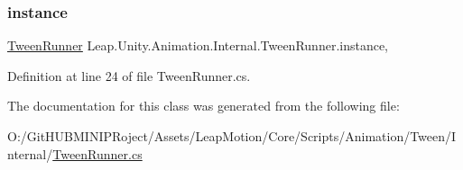 \subsubsection{\texorpdfstring{instance}{instance}}
{\footnotesize\ttfamily \mbox{\hyperlink{class_leap_1_1_unity_1_1_animation_1_1_internal_1_1_tween_runner}{Tween\+Runner}} Leap.\+Unity.\+Animation.\+Internal.\+Tween\+Runner.\+instance\hspace{0.3cm}{\ttfamily [static]}, {\ttfamily [get]}}



Definition at line 24 of file Tween\+Runner.\+cs.



The documentation for this class was generated from the following file\+:\begin{DoxyCompactItemize}
\item 
O\+:/\+Git\+H\+U\+B\+M\+I\+N\+I\+P\+Roject/\+Assets/\+Leap\+Motion/\+Core/\+Scripts/\+Animation/\+Tween/\+Internal/\mbox{\hyperlink{_tween_runner_8cs}{Tween\+Runner.\+cs}}\end{DoxyCompactItemize}

